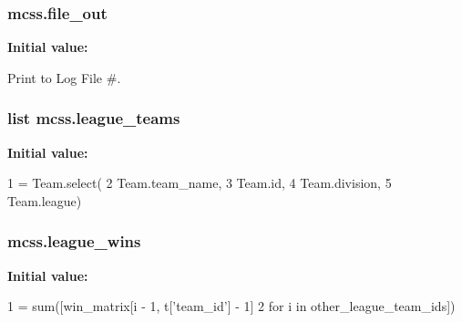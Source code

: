 \subsubsection[{\texorpdfstring{file\+\_\+out}{file_out}}]{\setlength{\rightskip}{0pt plus 5cm}mcss.\+file\+\_\+out}\hypertarget{namespacemcss_a4ffc2357edc2e03044c10aef3db8a7eb}{}\label{namespacemcss_a4ffc2357edc2e03044c10aef3db8a7eb}
{\bfseries Initial value\+:}


Print to Log File \#. 

\subsubsection[{\texorpdfstring{league\+\_\+teams}{league_teams}}]{\setlength{\rightskip}{0pt plus 5cm}list mcss.\+league\+\_\+teams}\hypertarget{namespacemcss_a94bc0de86c2e77402b118a7f7cf60e9b}{}\label{namespacemcss_a94bc0de86c2e77402b118a7f7cf60e9b}
{\bfseries Initial value\+:}
\begin{DoxyCode}
1 = Team.select(
2         Team.team\_name,
3         Team.id,
4         Team.division,
5         Team.league)
\end{DoxyCode}
\subsubsection[{\texorpdfstring{league\+\_\+wins}{league_wins}}]{\setlength{\rightskip}{0pt plus 5cm}mcss.\+league\+\_\+wins}\hypertarget{namespacemcss_a7157ddcf5faf0a3e3962a9a9a321b675}{}\label{namespacemcss_a7157ddcf5faf0a3e3962a9a9a321b675}
{\bfseries Initial value\+:}
\begin{DoxyCode}
1 = sum([win\_matrix[i - 1, t[\textcolor{stringliteral}{'team\_id'}] - 1]
2                                    \textcolor{keywordflow}{for} i \textcolor{keywordflow}{in} other\_league\_team\_ids])
\end{DoxyCode}
